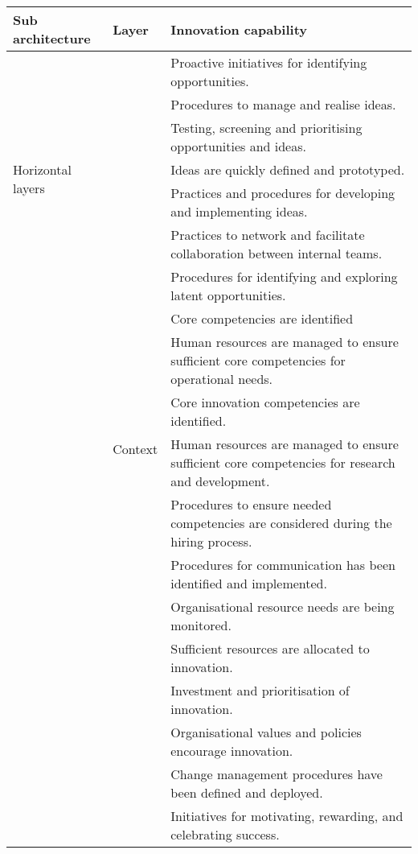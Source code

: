 {\centering
\begin{longtable}{|p{2.5cm}|p{3cm}|p{8cm}|}
    \hline
    Sub architecture & Layer & Innovation capability \\ \hline
    \multirow{7}{2.5cm}{Horizontal layers} 
        & \multirow{42}{3cm}{Context} &  Proactive initiatives for identifying opportunities. \\  \cline{3-3}
        & & Procedures to manage and realise ideas. \\ \cline{3-3}
        & & Testing, screening and prioritising opportunities and ideas. \\ \cline{3-3}
        & & Ideas are quickly defined and prototyped. \\ \cline{3-3}
        & & Practices and procedures for developing and implementing ideas. \\ \cline{3-3}
        & & Practices to network and facilitate collaboration between internal teams. \\ \cline{3-3} 
        & & Procedures for identifying and exploring latent opportunities. \\ \cline{3-3}
        & & Core competencies are identified \\ \cline{3-3}
        & & Human resources are managed to ensure sufficient core competencies for operational needs. \\ \cline{3-3}
        & & Core innovation competencies are identified. \\ \cline{3-3} 
        & & Human resources are managed to ensure sufficient core competencies for research and development. \\ \cline{3-3}
        & & Procedures to ensure needed competencies are considered during the hiring process. \\ \cline{3-3} 
        & & Procedures for communication has been identified and implemented. \\ \cline{3-3} 
        & & Organisational resource needs are being monitored. \\ \cline{3-3}
        & & Sufficient resources are allocated to innovation. \\ \cline{3-3}
        & & Investment and prioritisation of innovation. \\ \cline{3-3}
        & & Organisational values and policies encourage innovation. \\ \cline{3-3}
        & & Change management procedures have been defined and deployed. \\ \cline{3-3}
        & & Initiatives for motivating, rewarding, and celebrating success. \\ \cline{3-3}

\end{longtable}}

